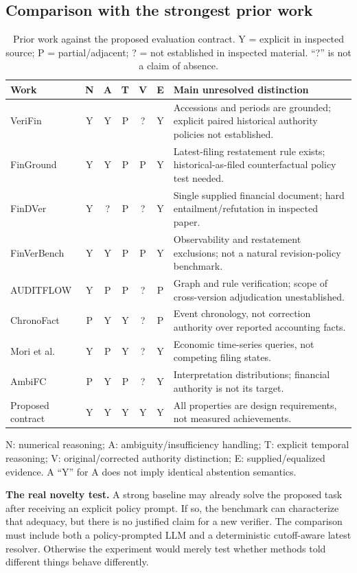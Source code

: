 \documentclass[11pt,a4paper]{article}
\newcommand{\lead}[1]{\textbf{\color{navy}#1}}
\begin{document}
\subsection{Comparison with the strongest prior work}
\begin{table}[H]\centering\small
\caption{Prior work against the proposed evaluation contract. Y = explicit in inspected source; P = partial/adjacent; ? = not established in inspected material. “?” is not a claim of absence.}
\begin{tabularx}{\linewidth}{p{32mm}cccccY}\toprule
Work & N & A & T & V & E & Main unresolved distinction\\\midrule
VeriFin \cite{verifin} & Y&Y&P&?&Y&Accessions and periods are grounded; explicit paired historical authority policies not established.\\
FinGround \cite{finground} & Y&Y&P&P&Y&Latest-filing restatement rule exists; historical-as-filed counterfactual policy test needed.\\
FinDVer \cite{findver} & Y&?&P&?&Y&Single supplied financial document; hard entailment/refutation in inspected paper.\\
FinVerBench \cite{finverbench} & Y&Y&P&P&Y&Observability and restatement exclusions; not a natural revision-policy benchmark.\\
AUDITFLOW \cite{auditflow} & Y&P&P&?&P&Graph and rule verification; scope of cross-version adjudication unestablished.\\
ChronoFact \cite{chronofact} & P&Y&Y&?&P&Event chronology, not correction authority over reported accounting facts.\\
Mori et al. \cite{mori} & Y&P&Y&?&Y&Economic time-series queries, not competing filing states.\\
AmbiFC \cite{ambifc} & P&Y&P&?&Y&Interpretation distributions; financial authority is not its target.\\
Proposed contract & Y&Y&Y&Y&Y&All properties are design requirements, not measured achievements.\\\bottomrule
\end{tabularx}
\smallskip\footnotesize N: numerical reasoning; A: ambiguity/insufficiency handling; T: explicit temporal reasoning; V: original/corrected authority distinction; E: supplied/equalized evidence. A “Y” for A does not imply identical abstention semantics.\end{table}

\lead{The real novelty test.} A strong baseline may already solve the proposed task after receiving an explicit policy prompt. If so, the benchmark can characterize that adequacy, but there is no justified claim for a new verifier. The comparison must include both a policy-prompted LLM and a deterministic cutoff-aware latest resolver. Otherwise the experiment would merely test whether methods told different things behave differently.
\end{document}
